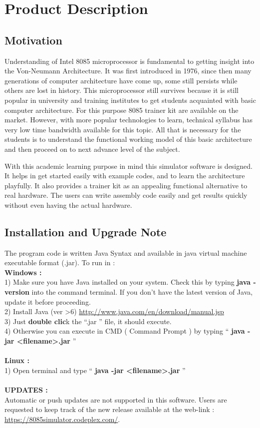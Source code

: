\chapter{Product Description}

\section{Motivation}
Understanding of Intel 8085 microprocessor is fundamental to getting insight into the Von-Neumann Architecture. It was first introduced in 1976, since then many generations of computer architecture have come up, some still persists while others are lost in history. This microprocessor still survives because it is still popular in university and training institutes to get students acquainted with basic computer architecture. For this purpose 8085 trainer kit are available on the market. However, with more popular technologies to learn, technical syllabus has very low time bandwidth available for this topic. All that is necessary for the students is to understand the functional working model of this basic architecture and then proceed on to next advance level of the subject.

With this academic learning purpose in mind this simulator software is designed. It helps in get started easily with example codes, and to learn the architecture playfully. It also provides a trainer kit as an appealing functional alternative to real hardware. The users can write assembly code easily and get results quickly without even having the actual hardware. 

\section{Installation and Upgrade Note}

The program code is written Java Syntax and available in java virtual machine executable format (.jar). To run in :\\
\textbf{Windows : }\\
1)  Make sure you have Java installed on your system. Check this by typing \textbf{java -version} into the command terminal. If you don't have the latest version of Java, update it before proceeding. \\
2) Install Java (ver >6) \url{http://www.java.com/en/download/manual.jsp}\\
3) Just \textbf{double clic}k the ``.jar '' file, it should execute. \\
4) Otherwise you can execute in CMD ( Command Prompt ) by typing `` \textbf{java -jar <filename>.jar} ''\\
\\
\textbf{Linux : }\\
1) Open terminal and type `` \textbf{java -jar <filename>.jar} ''
\\
\\
\textbf{\large UPDATES : }\\
Automatic or push updates are not supported in this software. Users are requested to keep track of the new release available at the web-link :  \url{https://8085simulator.codeplex.com/}.
